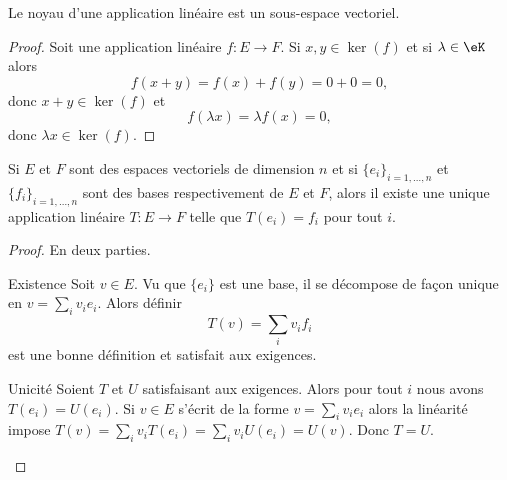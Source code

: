 \begin{proposition}     \label{PROPooRLLPooKYzsJp}
    Le noyau d'une application linéaire est un sous-espace vectoriel.
\end{proposition}

\begin{proof}
    Soit une application linéaire \( f\colon E\to F\). Si \( x,y\in \ker(f)\) et si \( \lambda\in \eK\) alors
    \begin{equation}
        f(x+y)=f(x)+f(y)=0+0=0,
    \end{equation}
    donc \( x+y\in \ker(f)\) et
    \begin{equation}
        f(\lambda x)=\lambda f(x)=0,
    \end{equation}
    donc \( \lambda x\in \ker(f)\).
\end{proof}

\begin{proposition}
    Si \( E\) et \( F\) sont des espaces vectoriels de dimension \( n\) et si \( \{ e_i \}_{i=1,\ldots, n}\) et \( \{ f_i \}_{i=1,\ldots, n}\) sont des bases respectivement de \( E\) et \( F\), alors il existe une unique application linéaire \( T\colon E\to F\) telle que \( T(e_i)=f_i\) pour tout \( i\).
\end{proposition}

\begin{proof}
    En deux parties.\begin{subproof}
        \item[Existence]
            Soit \( v\in E\). Vu que \( \{ e_i \}\) est une base, il se décompose de façon unique en \( v=\sum_iv_ie_i\). Alors définir
            \begin{equation}
                T(v)=\sum_iv_if_i
            \end{equation}
            est une bonne définition et satisfait aux exigences.
        \item[Unicité]
            Soient \( T\) et \( U\) satisfaisant aux exigences. Alors pour tout \( i\) nous avons \( T(e_i)=U(e_i)\). Si \( v\in E\) s'écrit de la forme \( v=\sum_iv_ie_i\) alors la linéarité impose \( T(v)=\sum_iv_iT(e_i)=\sum_iv_iU(e_i)=U(v)\). Donc \( T = U\).
    \end{subproof}
\end{proof}

